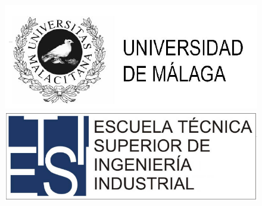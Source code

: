 
\begin{figure}
        \hspace{-0.5cm}	
		\includegraphics[scale=0.25]{./1-Portada/img/uma.png}
		\hspace{6cm}
		\includegraphics[scale= 0.25]{./1-Portada/img/etsii}
\end{figure}
\vspace*{0.2in}
